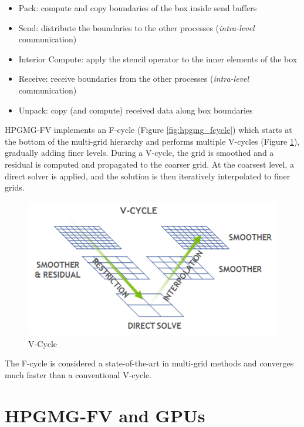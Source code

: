 \documentclass[review]{siamart1116}
\begin{document}
\begin{itemize}
\item Pack: compute and copy boundaries of the box inside send buffers
\item Send: distribute the boundaries to the other processes (\emph{intra-level} communication)
\item Interior Compute: apply the stencil operator to the inner elements of the box
\item Receive: receive boundaries from the other processes (\emph{intra-level} communication)
\item Unpack: copy (and compute) received data along box boundaries
\end{itemize}

HPGMG-FV implements an F-cycle (Figure \ref{fig:hpgmg_fcycle}) which starts at the bottom of the multi-grid hierarchy and performs multiple V-cycles (Figure \ref{fig:hpgmg_vcycle}), gradually adding finer levels. %
During a V-cycle, the grid is smoothed and a residual is computed and propagated to the coarser grid. At the coarsest level, a direct solver is applied, and the solution is then iteratively interpolated to finer grids.

\begin{figure}[h]
\centering
\includegraphics[scale=0.7]{hpgmg_v_cycle.png}
\caption{V-Cycle}
\label{fig:hpgmg_vcycle}
\end{figure}

The F-cycle is considered a state-of-the-art in multi-grid methods and converges much faster than a conventional V-cycle.\\

\section{HPGMG-FV and GPUs}\label{sec:hpgmg_cuda}
\end{document}
